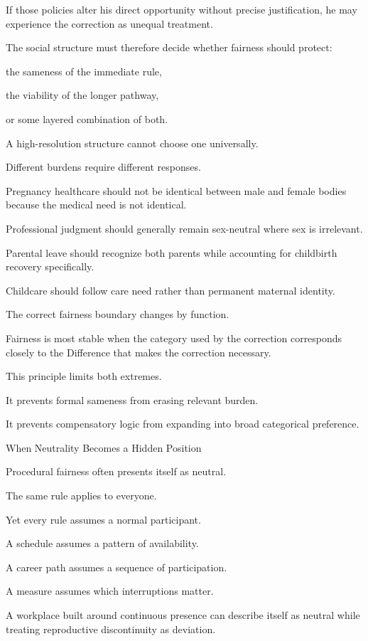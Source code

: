 If those policies alter his direct opportunity without precise justification, he may experience the correction as unequal treatment.

The social structure must therefore decide whether fairness should protect:

the sameness of the immediate rule,

the viability of the longer pathway,

or some layered combination of both.

A high-resolution structure cannot choose one universally.

Different burdens require different responses.

Pregnancy healthcare should not be identical between male and female bodies because the medical need is not identical.

Professional judgment should generally remain sex-neutral where sex is irrelevant.

Parental leave should recognize both parents while accounting for childbirth recovery specifically.

Childcare should follow care need rather than permanent maternal identity.

The correct fairness boundary changes by function.

Fairness is most stable when the category used by the correction corresponds closely to the Difference that makes the correction necessary.

This principle limits both extremes.

It prevents formal sameness from erasing relevant burden.

It prevents compensatory logic from expanding into broad categorical preference.

When Neutrality Becomes a Hidden Position

Procedural fairness often presents itself as neutral.

The same rule applies to everyone.

Yet every rule assumes a normal participant.

A schedule assumes a pattern of availability.

A career path assumes a sequence of participation.

A measure assumes which interruptions matter.

A workplace built around continuous presence can describe itself as neutral while treating reproductive discontinuity as deviation.

